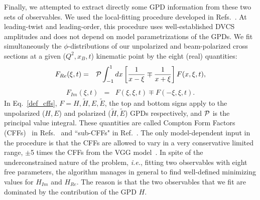 \documentclass[nofootinbib,twocolumn,showpacs,prl,superscriptaddress,secnumarabic,amssymb,nobibnotes,aps,floatfix]{revtex4-1}
\begin{document}
Finally, we attempted to extract directly some GPD information from these two sets of observables.
We used the local-fitting procedure developed in
Refs.~\cite{Guidal:2008ie,Guidal:2009aa,Guidal:2010ig,Guidal:2010de}.
At leading-twist and leading-order, this procedure uses well-established DVCS amplitudes and
does not depend on model parametrizations of the GPDs. We fit simultaneously the
$\phi$-distributions of our unpolarized and beam-polarized cross sections
at a given ($Q^2,x_B,t$) kinematic point by the eight (real) quantities:
\begin{eqnarray}
F_{Re}(\xi,t) &=& {\cal P}\int_{-1}^{1}dx\left[\frac{1}{x-\xi}\mp\frac{1}{x+\xi}\right]
F(x,\xi,t), \nonumber
\end{eqnarray}
\begin{eqnarray}
F_{Im}(\xi,t) &=& F(\xi,\xi,t) \mp F(-\xi,\xi,t). \label{def_cffs}
\end{eqnarray}
In Eq.~\ref{def_cffs}, $F=H, \tilde H, E,\tilde E$, the top and bottom signs apply to the
unpolarized ($H,E$) and polarized ($\tilde H,\tilde E$) GPDs respectively, and ${\cal P}$ is the
principal value integral.
These quantities are called Compton Form Factors (CFFs)~\cite{CFFdef2} in
Refs.~\cite{Guidal:2008ie,Guidal:2009aa,Guidal:2010ig,Guidal:2010de}
and ``sub-CFFs" in Ref.~\cite{Kumericki:2013lia}.
The only model-dependent input in the procedure is that the CFFs are
allowed to vary in a very conservative limited range,
$\pm$5 times the CFFs from the VGG model~\cite{Guidal:2004nd}.
In spite of the underconstrained nature of the problem, \textit{i.e.}, fitting two
observables with eight free parameters, the algorithm manages in general to find well-defined
minimizing values
for $H_{Im}$ and $H_{Re}$. The reason is that the two observables
that we fit are dominated by the contribution of the GPD $H$.
\end{document}
